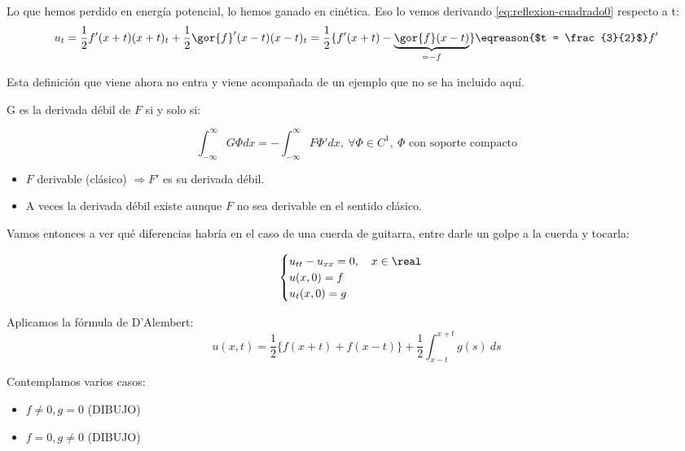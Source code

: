 			Lo que hemos perdido en energía potencial, lo hemos ganado en cinética. Eso lo vemos derivando \ref{eq:reflexion-cuadrado0} respecto a t:
			\[ u_t = \frac{1}{2} f'(x+t) (x+t)_t + \frac{1}{2} \gor{f}' (x-t)(x-t)_t = \frac{1}{2} \{ f'(x+t) - \underbrace{\gor{f} (x-t)}_{=-f} \} \eqreason{$t = \frac{3}{2}$} f'  \]


			\clearpage %
			\obs Esta definición que viene ahora no entra y viene acompañada de un ejemplo que no se ha incluido aquí.

			\begin{defn}

				G es la derivada débil de $F$ si y solo si:

				\[ \int_{-\infty}^\infty G\Phi dx = -\int_{-\infty}^\infty F \Phi' dx, \ \forall \Phi \in C^1, \ \Phi \text{ con soporte compacto} \]

				\begin{itemize}
					\item $F$ derivable (clásico) $\Rightarrow F'$ es su derivada débil.
					\item A veces la derivada débil existe aunque $F$ no sea derivable en el sentido clásico.

				\end{itemize}
			\end{defn}

			Vamos entonces a ver qué diferencias habría en el caso de una cuerda de guitarra, entre darle un golpe a la cuerda y tocarla:

			\[\begin{cases}
				u_{tt} -u_{xx} =0, \quad x \in \real \\
				u(x,0) = f \\
				u_t(x,0) = g
			\end{cases}\]

			Aplicamos la fórmula de D'Alembert: 
			\[ u(x,t) = \frac{1}{2} \{ f(x+t) + f(x-t) \} + \frac{1}{2} \int_{x-t}^{x+t} g(s) \ ds \]

			Contemplamos varios casos:

			\begin{itemize}
				\item $f \neq 0, g = 0$
					(DIBUJO)

				\item $f=0, g \neq 0$
					(DIBUJO)

			\end{itemize}


